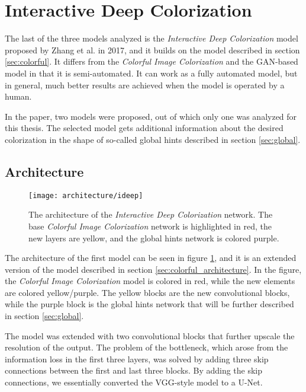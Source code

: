 \clearpage
\section{Interactive Deep Colorization}
\label{sec:ideep}

The last of the three models analyzed is the \textit{Interactive Deep Colorization}
model proposed by Zhang et al. in 2017, and it builds on the model described 
in section \ref{sec:colorful}. It differs from the \textit{Colorful Image Colorization}
and the GAN-based model in that it is semi-automated. It can work as a fully automated model, 
but in general, much better results are achieved when the model is operated by a human. 

In the paper, two models were proposed, out of which only one was analyzed for this thesis. 
The selected model gets additional information about the desired colorization in the 
shape of so-called global hints described in section \ref{sec:global}.

\subsection{Architecture}
\label{sec:ideep_architecture}

\begin{figure}[!ht]
	\centering
	\texttt{[image: architecture/ideep]}
    \caption{The architecture of the \textit{Interactive Deep Colorization} network. 
	The base \textit{Colorful Image Colorization} network is highlighted in red, the new 
	layers are yellow, and the global hints network is colored purple.}
	\label{fig:architecture_ideep}
\end{figure}

The architecture of the first model can be seen in figure \ref{fig:architecture_ideep}, 
and it is an extended version of the model described in section \ref{sec:colorful_architecture}. 
In the figure, the \textit{Colorful Image Colorization} model is colored in red, while 
the new elements are colored yellow/purple. The yellow blocks are the new convolutional 
blocks, while the purple block is the global hints network that will be further described
in section \ref{sec:global}.

The model was extended with two convolutional blocks that further upscale the resolution 
of the output. The problem of the bottleneck, which arose from the information loss in the 
first three layers, was solved by adding three skip connections between the first and last
three blocks. By adding the skip connections, we essentially converted the VGG-style model
to a U-Net.

